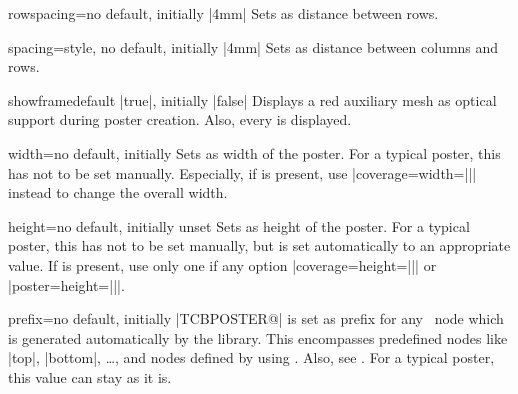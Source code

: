 \begin{posterTcbKey}[][doc new=2017-07-03]{rowspacing}{=}{no default, initially |4mm|}
  Sets  as distance between rows.
\end{posterTcbKey}

\begin{posterTcbKey}[][doc new=2017-07-03]{spacing}{=}{style, no default, initially |4mm|}
  Sets  as distance between columns and rows.
\end{posterTcbKey}


\begin{posterTcbKey}[][doc new=2017-07-03]{showframe}{}{default |true|, initially |false|}
  Displays a red auxiliary mesh as optical support during poster creation.
  Also, every  is displayed.
\end{posterTcbKey}


\begin{posterTcbKey}[][doc new=2017-07-03]{width}{=}{no default, initially }
  Sets  as width of the poster. For a typical poster, this has not
  to be set manually. Especially, if  is present,
  use |coverage={width=||}| instead to change the overall width.
\end{posterTcbKey}

\enlargethispage*{1cm}

\begin{posterTcbKey}[][doc new=2017-07-03]{height}{=}{no default, initially unset}
  Sets  as height of the poster. For a typical poster, this has not
  to be set manually, but is set automatically to an appropriate value.
  If  is present, use only one if any option
  |coverage={height=||}| or |poster={height=||}|.
\end{posterTcbKey}


\begin{posterTcbKey}[][doc new=2017-07-03]{prefix}{=}{no default, initially |TCBPOSTER@|}
   is set as prefix for any \tikzname\ node which is generated
  automatically by the  library. This encompasses predefined
  nodes like |top|, |bottom|, \ldots, and nodes defined by using
  . Also, see .
  For a typical poster, this value can stay as it is.
\end{posterTcbKey}


